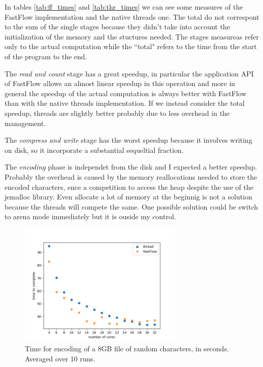 \documentclass[12pt, letterpaper]{article}
\begin{document}
In tables \ref{tab:ff_times} and \ref{tab:thr_times} we can see some measures of the FastFlow implementation and the native threads one. The total do not correspont to the sum of the single stages because they didn't take into account the initialization of the memory and the stuctures needed. The stages measureas refer only to the actual computation while the ``total" refers to the time from the start of the program to the end.

The \textit{read and count} stage has a great speedup, in particular the application API of FastFlow allows an almost linear speedup in this operation and more in general the speedup of the actual computation is always better with FastFlow than with the native threads implementation. If we instead consider the total speedup, threads are slightly better probably due to less overhead in the management. 

The \textit{compress and write} stage has the worst speedup because it involves writing on disk, so it incorporate a substantial sequeltial fraction. 

The \textit{encoding} phase is independet from the disk and I expected a better speedup. Probably the overhead is caused by the memory reallocations needed to store the encoded characters, ence a competition to access the heap despite the use of the jemalloc library. Even allocate a lot of memory at the beginnig is not a solution because the threads will compete the same. One possible solution could be switch to arena mode immediately but it is ouside my control.

\begin{figure}
    \centering
    \includegraphics[width=0.7\textwidth]{./images/time_to_complete.png}
    \caption{Time for encoding of a 8GB file of random characters, in seconds. Averaged over 10 runs.}
    \label{fig:time_to_complete}
\end{figure}
\end{document}
